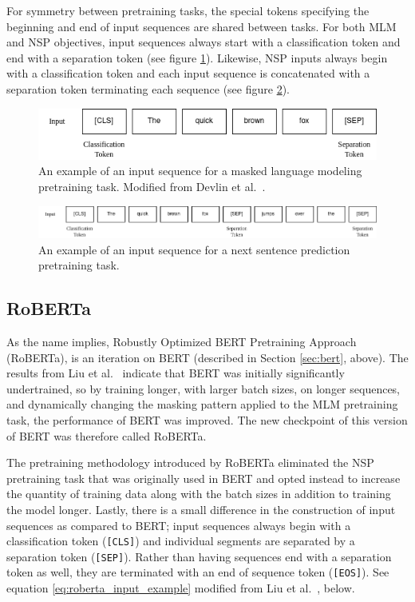\documentclass[12pt]{article}
\begin{document}
For symmetry between pretraining tasks, the special tokens specifying the beginning and end of input sequences are shared between tasks. For both MLM
and NSP objectives, input sequences always start with a classification token and end with a separation token (see figure
\ref{fig:bert_mlm_input_example}). Likewise, NSP inputs always begin with a classification token and each input sequence is concatenated with a
separation token terminating each sequence (see figure \ref{fig:bert_nsp_input_example}).

\begin{figure}[!t]
    \includegraphics[width=\linewidth]{figures/BERT_MLM_input.png}
    \caption{An example of an input sequence for a masked language modeling pretraining task. Modified from Devlin et al.~\cite{devlin_bert_2019}.}
    \label{fig:bert_mlm_input_example}
\end{figure}

\begin{figure}[!t]
    \includegraphics[width=\linewidth]{figures/BERT_NSP_input.png}
    \caption{An example of an input sequence for a next sentence prediction pretraining task.}
    \label{fig:bert_nsp_input_example}
\end{figure}

\subsection{RoBERTa}\label{sec:roberta}
As the name implies, Robustly Optimized BERT Pretraining Approach (RoBERTa), is an iteration on BERT (described in Section \ref{sec:bert}, above).
The results from Liu et al.~\cite{liu_roberta_2019} indicate that BERT was initially significantly undertrained, so by training longer, with larger
batch sizes, on longer sequences, and dynamically changing the masking pattern applied to the MLM pretraining task, the performance of BERT was
improved. The new checkpoint of this version of BERT was therefore called RoBERTa.

The pretraining methodology introduced by RoBERTa eliminated the NSP pretraining task that was originally used in BERT and opted instead to increase
the quantity of training data along with the batch sizes in addition to training the model longer. Lastly, there is a small difference in the
construction of input sequences as compared to BERT; input sequences always begin with a classification token (\lstinline|[CLS]|) and individual
segments are separated by a separation token (\lstinline|[SEP]|). Rather than having sequences end with a separation token as well, they are
terminated with an end of sequence token (\lstinline|[EOS]|). See equation \ref{eq:roberta_input_example} modified from Liu et
al.~\cite{liu_roberta_2019}, below.
\end{document}
